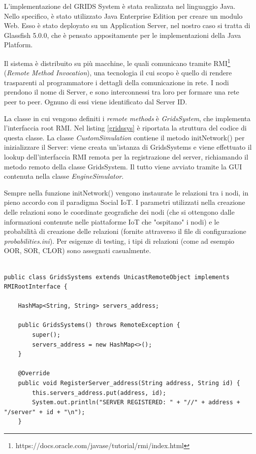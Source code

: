 L'implementazione del GRIDS System è stata realizzata nel linguaggio Java. Nello specifico, è stato utilizzato Java Enterprise Edition per creare un modulo Web.
Esso è stato deployato su un Application Server, nel nostro caso si tratta di Glassfish 5.0.0, che è pensato appositamente per le implementazioni della Java Platform.


Il sistema è distribuito su più macchine, le quali comunicano tramite RMI\footnote{https://docs.oracle.com/javase/tutorial/rmi/index.html} (\textit{Remote Method Invocation}), una tecnologia il cui scopo è quello di rendere trasparenti al programmatore i dettagli della comunicazione in rete. I nodi prendono il nome di Server, e sono interconnessi tra loro per formare una rete peer to peer. Ognuno di essi viene identificato dal Server ID.

La classe in cui vengono definiti i \textit{remote methods} è \textit{GridsSystem}, che implementa l'interfaccia root RMI. Nel listing \ref{gridssys} è riportata la struttura del codice di questa classe.
La classe \textit{CustomSimulation} contiene il metodo initNetwork() per inizializzare il Server: viene creata un'istanza di GridsSystems e viene effettuato il lookup dell'interfaccia RMI remota per la registrazione del server, richiamando il metodo remoto della classe GridsSystem. Il tutto viene avviato tramite la GUI contenuta nella classe \textit{EngineSimulator}.

Sempre nella funzione initNetwork() vengono instaurate le relazioni tra i nodi, in pieno accordo con il paradigma Social IoT. I parametri utilizzati nella creazione delle relazioni sono le coordinate geografiche dei nodi (che si ottengono dalle informazioni contenute nelle piattaforme IoT che "ospitano" i nodi) e le probabilità di creazione delle relazioni (fornite attraverso il file di configurazione \textit{probabilities.ini}). Per esigenze di testing, i tipi di relazioni (come ad esempio OOR, SOR, CLOR) sono assegnati casualmente.

\begin{lstlisting}[caption={GridsSystem.java},label={gridssys},style={c}]

public class GridsSystems extends UnicastRemoteObject implements RMIRootInterface {

    HashMap<String, String> servers_address;

    public GridsSystems() throws RemoteException {
        super();
        servers_address = new HashMap<>();
    }

    @Override
    public void RegisterServer_address(String address, String id) {
        this.servers_address.put(address, id);
        System.out.println("SERVER REGISTERED: " + "//" + address + "/server" + id + "\n");
    }
\end{lstlisting}

